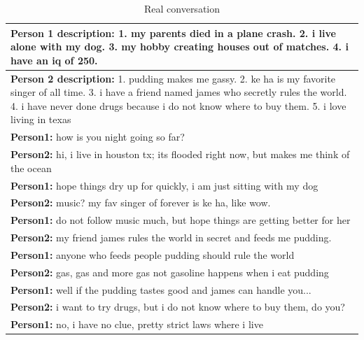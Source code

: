 \begin{table}[ht]
\centering
 \begin{tabular}{|p{14cm}|} 
 \hline\hline
 \textbf{Person 1 description:} 1. my parents died in a plane crash. 2. i live alone with my dog. 3. my hobby creating houses out of matches. 4. i have an iq of 250.  \\
 \hline
 \textbf{Person 2 description:} 1. pudding makes me gassy. 2. ke ha is my favorite singer of all time. 3. i have a friend named james who secretly rules the world. 4. i have never done drugs because i do not know where to buy them. 5. i love living in texas \\
 \hline\hline
 \textbf{Person1:} how is you night going so far? \\
 \textbf{Person2:} hi, i live in houston tx; its flooded right now, but makes me think of the ocean \\ 
 \textbf{Person1:} hope things dry up for quickly, i am just sitting with my dog  \\
 \textbf{Person2:} music? my fav singer of forever is ke ha, like wow. \\
 \textbf{Person1:} do not follow music much, but hope things are getting better for her \\
 \textbf{Person2:} my friend james rules the world in secret and feeds me pudding. \\
 \textbf{Person1:} anyone who feeds people pudding should rule the world \\
 \textbf{Person2:} gas, gas and more gas not gasoline happens when i eat pudding \\
 \textbf{Person1:} well if the pudding tastes good and james can handle you... \\
 \textbf{Person2:} i want to try drugs, but i do not know where to buy them, do you? \\
 \textbf{Person1:} no, i have no clue, pretty strict laws where i live  \\
 \hline\hline
 \end{tabular}
 \caption{Real conversation}
\label{tab:real2}
\end{table}



